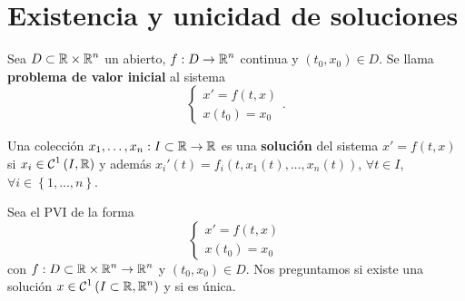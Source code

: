 \chapter{Existencia y unicidad de soluciones}

\begin{definition}
Sea $\displaystyle D \subset \mathbb{R} \times \mathbb{R}^{n} $ un abierto, $\displaystyle f : D \to \mathbb{R}^{n} $ continua y $\displaystyle \left(t_{0}, x_{0}\right) \in D $. Se llama \textbf{problema de valor inicial} al sistema
\[
\begin{cases}
x' = f\left(t,x\right) \\
x\left(t_{0}\right)=x_{0}
\end{cases}
.\]
\end{definition}

\begin{definition}[Solución]
	Una colección $\displaystyle x_{1}, \ldots, x_{n} : I\subset \mathbb{R} \to \mathbb{R} $ es una \textbf{solución} del sistema $\displaystyle x' = f\left(t, x\right) $ si $\displaystyle x_{i}\in \mathcal{C}^{1}\left(I, \mathbb{R}\right) $ y además $\displaystyle x_{i}' \left(t\right)=f_{i}\left(t, x_{1}\left(t\right), \ldots, x_{n}\left(t\right)\right) $, $\displaystyle \forall t \in I $, $\displaystyle \forall i \in \left\{ 1, \ldots, n\right\}  $. 
\end{definition}
Sea el PVI de la forma
\[
\begin{cases}
x' = f\left(t, x\right) \\
x\left(t_{0}\right)=x_{0}
\end{cases}
\]
con $\displaystyle f : D \subset \mathbb{R} \times \mathbb{R}^{n} \to \mathbb{R}^{n} $ y $\displaystyle \left(t_{0}, x_{0}\right)\in D $. Nos preguntamos si existe una solución $\displaystyle x \in \mathcal{C}^{1}\left(I \subset \mathbb{R}, \mathbb{R}^{n}\right) $ y si es única.
